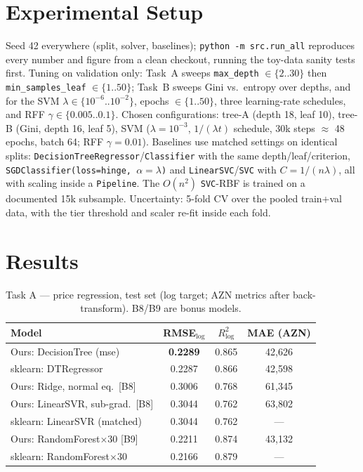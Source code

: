 \documentclass[10pt,twocolumn,a4paper]{article}
\begin{document}
\section{Experimental Setup}
Seed 42 everywhere (split, solver, baselines); \texttt{python -m
src.run\_all} reproduces every number and figure from a clean checkout,
running the toy-data sanity tests first. Tuning on validation only:
Task~A sweeps \texttt{max\_depth} $\in \{2..30\}$ then
\texttt{min\_samples\_leaf} $\in \{1..50\}$; Task~B sweeps Gini vs.\
entropy over depths, and for the SVM $\lambda \in
\{10^{-6}..10^{-2}\}$, epochs $\in \{1..50\}$, three learning-rate
schedules, and RFF $\gamma \in \{0.005..0.1\}$. Chosen configurations:
tree-A (depth 18, leaf 10), tree-B (Gini, depth 16, leaf 5), SVM
($\lambda{=}10^{-3}$, $1/(\lambda t)$ schedule, 30k steps $\approx$ 48
epochs, batch 64; RFF $\gamma{=}0.01$).
Baselines use matched settings on identical splits:
\texttt{DecisionTreeRegressor}/\texttt{Classifier} with the same
depth/leaf/criterion, \texttt{SGDClassifier(loss=hinge,
$\alpha{=}\lambda$)} and \texttt{LinearSVC}/\texttt{SVC} with
$C = 1/(n\lambda)$, all with scaling inside a \texttt{Pipeline}. The
$O(n^2)$ \texttt{SVC}-RBF is trained on a documented 15k subsample.
Uncertainty: 5-fold CV over the pooled train+val data, with the tier
threshold and scaler re-fit inside each fold.

\section{Results}

\begin{table}[t]
  \centering
  \caption{Task A --- price regression, test set (log target; AZN metrics
  after back-transform). B8/B9 are bonus models.}
  \label{tab:taskA}
  \small
  \begin{tabular}{@{}lccc@{}}
    \toprule
    Model & RMSE$_{\log}$ & $R^2_{\log}$ & MAE (AZN) \\
    \midrule
    Ours: DecisionTree (mse)   & \textbf{0.2289} & 0.865 & 42{,}626 \\
    sklearn: DTRegressor        & 0.2287 & 0.866 & 42{,}598 \\
    Ours: Ridge, normal eq.\ [B8] & 0.3006 & 0.768 & 61{,}345 \\
    Ours: LinearSVR, sub-grad.\ [B8] & 0.3044 & 0.762 & 63{,}802 \\
    sklearn: LinearSVR (matched) & 0.3044 & 0.762 & --- \\
    Ours: RandomForest$\times$30 [B9] & 0.2211 & 0.874 & 43{,}132 \\
    sklearn: RandomForest$\times$30  & 0.2166 & 0.879 & --- \\
    \bottomrule
  \end{tabular}
\end{table}
\end{document}
